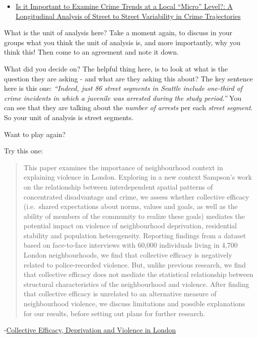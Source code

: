 \documentclass[
]{book}
\providecommand{\tightlist}{%
  \setlength{\itemsep}{0pt}\setlength{\parskip}{0pt}}
\begin{document}
\begin{itemize}
\tightlist
\item
  \href{https://link.springer.com/article/10.1007/s10940-009-9081-y}{Is it Important to Examine Crime Trends at a Local ``Micro'' Level?: A Longitudinal Analysis of Street to Street Variability in Crime Trajectories}
\end{itemize}

What is the unit of analysis here? Take a moment again, to discuss in your groups what you think the unit of analysis is, and more importantly, why you think this! Then come to an agreement and note it down.

What did you decide on? The helpful thing here, is to look at what is the question they are asking - and what are they asking this about? The key sentence here is this one: \emph{``Indeed, just 86 street segments in Seattle include one-third of crime incidents in which a juvenile was arrested during the study period.''} You can see that they are talking about the \emph{number of arrests} per each \emph{street segment}. So your unit of analysis is street segments.

Want to play again?

Try this one:

\begin{quote}
This paper examines the importance of neighbourhood context in explaining violence in London. Exploring in a new context Sampson's work on the relationship between interdependent spatial patterns of concentrated disadvantage and crime, we assess whether collective efficacy (i.e.~shared expectations about norms, values and goals, as well as the ability of members of the community to realize these goals) mediates the potential impact on violence of neighbourhood deprivation, residential stability and population heterogeneity. Reporting findings from a dataset based on face-to-face interviews with 60,000 individuals living in 4,700 London neighbourhoods, we find that collective efficacy is negatively related to police-recorded violence. But, unlike previous research, we find that collective efficacy does not mediate the statistical relationship between structural characteristics of the neighbourhood and violence. After finding that collective efficacy is unrelated to an alternative measure of neighbourhood violence, we discuss limitations and possible explanations for our results, before setting out plans for further research.
\end{quote}

-\href{https://academic.oup.com/bjc/article-abstract/53/6/1050/418215}{Collective Efficacy, Deprivation and Violence in London}
\end{document}
